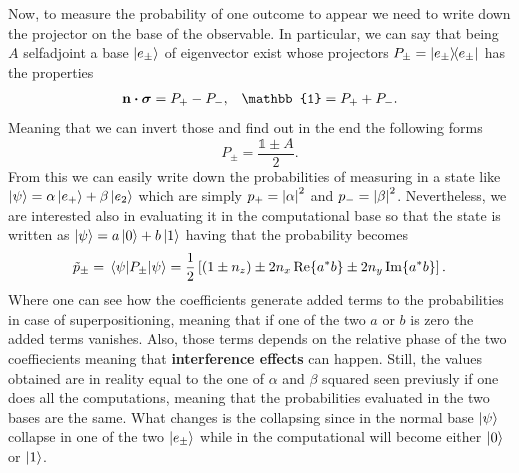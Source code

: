 {    Now, to measure the probability of one outcome to appear we need to write down the projector on the base of the observable. In particular, we can say that being $A$ selfadjoint a base $\ket{e_\pm}$ of eigenvector exist whose projectors $P_\pm = \ketbra{e_{\pm}}$ has the properties
    \begin{align}
        &\vb{n}\vdot\vb*{\sigma} = P_+ - P_-, &\mathbb{1} = P_+ + P_-.
    \end{align}
    Meaning that we can invert those and find out in the end the following forms
    \begin{equation}
        P_\pm = \frac{\mathbb{1} \pm A}{2}.
    \end{equation}
    From this we can easily write down the probabilities of measuring in a state like $\ket{\psi} = \alpha\ket{e_+} + \beta\ket{e_2}$ which are simply $p_+ = \abs{\alpha}^2$ and $p_- = \abs{\beta}^2$. Nevertheless, we are interested also in evaluating it in the computational base so that the state is written as  $\ket{\psi} = a\ket{0} + b\ket{1}$ having that the probability becomes
    \begin{equation}
        \tilde{p}_\pm = \ev{P_\pm}{\psi} = \frac{1}{2}\left[ (1\pm n_z) \pm 2n_x\Re{a^*b} \pm 2n_y\Im{a^*b} \right].
    \end{equation}
    Where one can see how the coefficients generate added terms to the probabilities in case of superpositioning, meaning that if one of the two $a$ or $b$ is zero the added terms vanishes. Also, those terms depends on the relative phase of the two coeffiecients meaning that \textbf{interference effects} can happen. Still, the values obtained are in reality equal to the one of $\alpha$ and $\beta$ squared seen previusly if one does all the computations, meaning that the probabilities evaluated in the two bases are the same. What changes is the collapsing since in the normal base $\ket{\psi}$ collapse in one of the two $\ket{e_\pm}$ while in the computational will become either $\ket{0}$ or $\ket{1}$.

}
